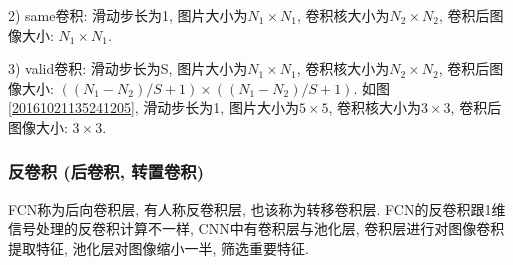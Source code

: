2) same卷积: 滑动步长为1, 图片大小为$N_1\times N_1$, 卷积核大小为$N_2\times N_2$, 卷积后图像大小: $N_1\times N_1$.

3) valid卷积: 滑动步长为S, 图片大小为$N_1\times N_1$, 卷积核大小为$N_2\times N_2$, 卷积后图像大小: $ ( (N_1-N_2)/S+1) \times ( (N_1-N_2)/S+1)$.
如图 \ref{20161021135241205}, 滑动步长为1, 图片大小为$5\times 5$, 卷积核大小为$3\times 3$, 卷积后图像大小: $3\times 3$.

\subsubsection{反卷积 (后卷积, 转置卷积)}
FCN称为后向卷积层, 有人称反卷积层, 也该称为转移卷积层.
FCN的反卷积跟1维信号处理的反卷积计算不一样,
CNN中有卷积层与池化层, 卷积层进行对图像卷积提取特征, 池化层对图像缩小一半, 筛选重要特征.

